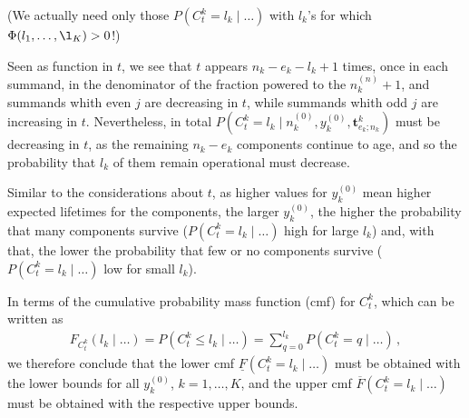 \documentclass[12pt,a4paper,fleqn]{narms}
\newcommand{\mbf}[1]{\mathbf{#1}}
\newcommand{\uz}{^{(0)}} %
\newcommand{\un}{^{(n)}} %
\newcommand{\ul}[1]{\underline{#1}}
\newcommand{\ol}[1]{\overline{#1}}
\def\ykz{y\uz_k}
\def\nkz{n\uz_k}
\def\nkn{n\un_k}
\def\PkZ{\Pi\uz_k}
\begin{document}
(We actually need only those $P(C^k_t = l_k\mid \ldots)$ with $l_k$'s for which $\Phi(l_1,\ldots,\l_K) > 0$!)


Seen as function in $t$, we see that $t$ appears $n_k-e_k-l_k+1$ times,
once in each summand, in the denominator of the fraction powered to the $\nkn+1$,
and summands whith even $j$ are decreasing in $t$,
while summands whith odd $j$ are increasing in $t$.
Nevertheless, in total $P(C^k_t = l_k\mid\nkz,\ykz, \mbf{t}^k_{e_k;n_k})$
must be decreasing in $t$, as the remaining $n_k-e_k$ components continue to age,
and so the probability that $l_k$ of them remain operational must decrease.


Similar to the considerations about $t$, as higher values for $\ykz$ mean higher expected lifetimes for the components,
the larger $\ykz$, the higher the probability that many components survive
($P(C^k_t = l_k\mid\ldots)$ high for large $l_k$)
and, with that, the lower the probability that few or no components survive
($P(C^k_t = l_k\mid\ldots)$ low for small $l_k$).

In terms of the cumulative probability mass function (cmf) for $C^k_t$, which can be written as 
\begin{align}
F_{C^k_t}(l_k \mid \ldots) = P(C^k_t \leq l_k\mid\ldots) = \sum_{q=0}^{l_k} P(C^k_t = q\mid\ldots)\,,
\end{align}
we therefore conclude that
the lower cmf $\ul{F}(C^k_t = l_k\mid \ldots)$ must be obtained with the lower bounds for all $\ykz$, $k=1,\ldots,K$,
and the upper cmf $\ol{F}(C^k_t = l_k\mid \ldots)$ must be obtained with the respective upper bounds.

\end{document}
